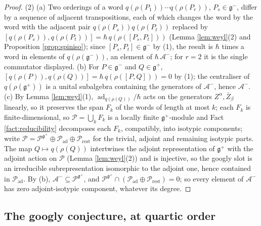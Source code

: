 \documentclass[11pt]{article}
\theoremstyle{definition}
\begin{document}
\begin{proof}
(2) (a) Two orderings of a word $q(\rho(P_1))\cdots q(\rho(P_r))$, $P_s \in \mathfrak{g}^-$, differ by a sequence of adjacent transpositions, each of which changes the word by the word with the adjacent pair $q(\rho(P_s))q(\rho(P_t))$ replaced by $[q(\rho(P_s)), q(\rho(P_t))] = \hbar\,q(\rho([P_s, P_t]))$ (Lemma \ref{lem:weyl}(2) and Proposition \ref{prop:spiniso}); since $[P_s, P_t] \in \mathfrak{g}^-$ by (1), the result is $\hbar$ times a word in elements of $q(\rho(\mathfrak{g}^-))$, an element of $\hbar\,\mathcal{A}^-$; for $r = 2$ it is the single commutator displayed. (b) For $P \in \mathfrak{g}^-$ and $Q \in \mathfrak{g}^+$, $[q(\rho(P)), q(\rho(Q))] = \hbar\,q(\rho([P,Q])) = 0$ by (1); the centraliser of $q(\rho(\mathfrak{g}^+))$ is a unital subalgebra containing the generators of $\mathcal{A}^-$, hence $\mathcal{A}^-$. (c) By Lemma \ref{lem:weyl}(1), $\operatorname{ad}_{q(\rho(Q))}/\hbar$ acts on the generators $Z^\alpha, \bar Z_\beta$ linearly, so it preserves the span $F_k$ of the words of length at most $k$; each $F_k$ is finite-dimensional, so $\mathcal{P} = \bigcup_k F_k$ is a locally finite $\mathfrak{g}^+$-module and Fact \ref{fact:reducibility} decomposes each $F_k$, compatibly, into isotypic components; write $\mathcal{P} = \mathcal{P}^{\mathfrak{g}^+} \oplus \mathcal{P}_{\mathrm{ad}} \oplus \mathcal{P}_{\mathrm{rest}}$ for the trivial, adjoint and remaining isotypic parts. The map $Q \mapsto q(\rho(Q))$ intertwines the adjoint representation of $\mathfrak{g}^+$ with the adjoint action on $\mathcal{P}$ (Lemma \ref{lem:weyl}(2)) and is injective, so the googly slot is an irreducible subrepresentation isomorphic to the adjoint one, hence contained in $\mathcal{P}_{\mathrm{ad}}$. By (b), $\mathcal{A}^- \subseteq \mathcal{P}^{\mathfrak{g}^+}$, and $\mathcal{P}^{\mathfrak{g}^+} \cap (\mathcal{P}_{\mathrm{ad}} \oplus \mathcal{P}_{\mathrm{rest}}) = 0$; so every element of $\mathcal{A}^-$ has zero adjoint-isotypic component, whatever its degree.
\end{proof}

\subsection{The googly conjecture, at quartic order}\label{subsec:googlyconj}
\end{document}

